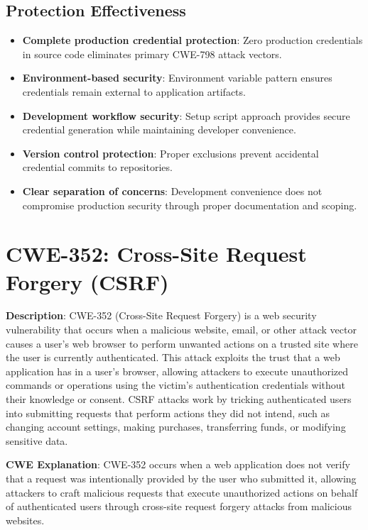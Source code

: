 \documentclass[]{UCD_CS_FYP_Report}
\begin{document}
\subsection{Protection Effectiveness}
\begin{itemize}
	\item \textbf{Complete production credential protection}: Zero production credentials in source code eliminates primary CWE-798 attack vectors.
	\item \textbf{Environment-based security}: Environment variable pattern ensures credentials remain external to application artifacts.
	\item \textbf{Development workflow security}: Setup script approach provides secure credential generation while maintaining developer convenience.
	\item \textbf{Version control protection}: Proper exclusions prevent accidental credential commits to repositories.
	\item \textbf{Clear separation of concerns}: Development convenience does not compromise production security through proper documentation and scoping.
\end{itemize}

\section{CWE-352: Cross-Site Request Forgery (CSRF)}

\textbf{Description}: CWE-352 (Cross-Site Request Forgery) is a web security vulnerability that occurs when a malicious website, email, or other attack vector causes a user's web browser to perform unwanted actions on a trusted site where the user is currently authenticated. This attack exploits the trust that a web application has in a user's browser, allowing attackers to execute unauthorized commands or operations using the victim's authentication credentials without their knowledge or consent. CSRF attacks work by tricking authenticated users into submitting requests that perform actions they did not intend, such as changing account settings, making purchases, transferring funds, or modifying sensitive data.

\textbf{CWE Explanation}: CWE-352 occurs when a web application does not verify that a request was intentionally provided by the user who submitted it, allowing attackers to craft malicious requests that execute unauthorized actions on behalf of authenticated users through cross-site request forgery attacks from malicious websites.
\end{document}
